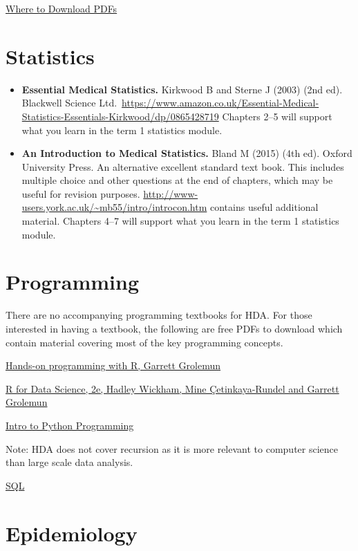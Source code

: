 \documentclass[
]{book}
\providecommand{\tightlist}{%
  \setlength{\itemsep}{0pt}\setlength{\parskip}{0pt}}
\begin{document}
\href{https://www.pdfreaderpro.com/blog/download-free-pdf-books}{Where to Download PDFs}

\section{Statistics}\label{statistics-1}

\begin{itemize}
\tightlist
\item
  \textbf{Essential Medical Statistics.} Kirkwood B and Sterne J (2003) (2nd ed). Blackwell Science Ltd.~\url{https://www.amazon.co.uk/Essential-Medical-Statistics-Essentials-Kirkwood/dp/0865428719}
  Chapters 2--5 will support what you learn in the term 1 statistics module.
\item
  \textbf{An Introduction to Medical Statistics.} Bland M (2015) (4th ed). Oxford University Press. An alternative excellent standard text book. This includes multiple choice and other questions at the end of chapters, which may be useful for revision purposes. \url{http://www-users.york.ac.uk/~mb55/intro/introcon.htm} contains useful additional material. Chapters 4--7 will support what you learn in the term 1 statistics module.
\end{itemize}

\section{Programming}\label{programming-2}

There are no accompanying programming textbooks for HDA. For those interested in having a textbook, the following are free PDFs to download which contain material covering most of the key programming concepts.

\href{https://rstudio-education.github.io/hopr/index.html}{Hands-on programming with R, Garrett Grolemun}

\href{https://r4ds.hadley.nz/}{R for Data Science, 2e, Hadley Wickham, Mine Çetinkaya-Rundel and Garrett Grolemun}

\href{https://assets.openstax.org/oscms-prodcms/media/documents/Introduction_to_Python_Programming_-_WEB.pdf}{Intro to Python Programming}

Note: HDA does not cover recursion as it is more relevant to computer science than large scale data analysis.

\href{https://books.goalkicker.com/SQLBook/}{SQL}

\section{Epidemiology}\label{epidemiology}
\end{document}
